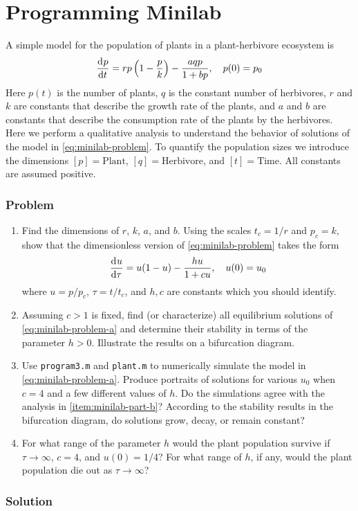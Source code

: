 \documentclass[12pt]{article}
\begin{document}
\section{Programming Minilab}
A simple model for the population of plants in a plant-herbivore ecosystem is
\begin{equation}
  \label{eq:minilab-problem}
  \frac{\mathrm{d}^{} {p}}{\mathrm{d}{t}^{}} = rp\left( 1-\frac{p}{k} \right) - \frac{aqp}{1+bp}, \quad p(0)=p_0
\end{equation}
Here $p(t)$ is the number of plants, $q$ is the constant number of herbivores,
$r$ and $k$ are constants that describe the growth rate of the plants, and $a$
and $b$ are constants that describe the consumption rate of the plants by the
herbivores. Here we perform a qualitative analysis to understand the behavior of
solutions of the model in \cref{eq:minilab-problem}. To quantify the population
sizes we introduce the dimensions $[p] = \text{Plant}$, $[q] =
\text{Herbivore}$, and $[t] = \text{Time}$. All constants are assumed positive.

\subsubsection*{Problem}
\begin{enumerate}
\item Find the dimensions of $r$, $k$, $a$, and $b$. Using the scales $t_c =
  1/r$ and $p_c = k$, show that the dimensionless version of
  \cref{eq:minilab-problem} takes the form
  \begin{equation}
    \label{eq:minilab-problem-a}
    \frac{\mathrm{d}^{} {u}}{\mathrm{d}{\tau}^{}}=u(1-u)-\frac{hu}{1+cu},\quad u(0)=u_0
  \end{equation}
  where $u=p/p_c$, $\tau=t/t_c$, and $h,c$ are constants which you should
  identify.
\item Assuming $c>1$ is fixed, find (or characterize) all equilibrium solutions
  of \cref{eq:minilab-problem-a} and determine their stability in terms of the
  parameter $h>0$. Illustrate the results on a bifurcation diagram.
\label{item:minilab-part-b}
\item Use \verb|program3.m| and \verb|plant.m| to numerically simulate the model
  in \cref{eq:minilab-problem-a}. Produce portraits of solutions for various
  $u_0$ when $c=4$ and a few different values of $h$. Do the simulations agree
  with the analysis in \cref{item:minilab-part-b}? According to the stability
  results in the bifurcation diagram, do solutions grow, decay, or remain
  constant?
\item For what range of the parameter $h$ would the plant population survive if
  $\tau\rightarrow\infty$, $c=4$, and $u(0)=1/4$? For what range of $h$, if any,
  would the plant population die out as $\tau\rightarrow\infty$?
\end{enumerate}

\subsubsection*{Solution}
\todo[]
\end{document}
